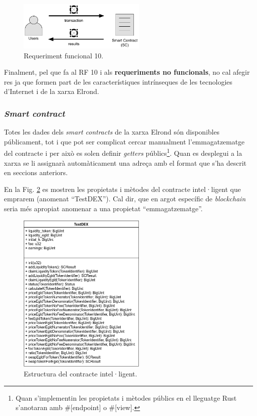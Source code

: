 \documentclass[11pt,a4paper]{article}
\begin{document}
\begin{figure}[h]
\includegraphics[width=0.55\textwidth]{cu_trans_results.png}
\centering
\caption{Requeriment funcional 10.}\label{fig:transresults}
\end{figure} 

Finalment, pel que fa al RF 10 i als \textbf{requeriments no funcionals}, no cal afegir res ja que formen part de les característiques intrínseques de les tecnologies d'Internet i de la xarxa Elrond.

\subsubsection{\textit{Smart contract}}\label{subsub:sc}
Totes les dades dels \textit{smart contracts} de la xarxa Elrond són disponibles públicament, tot i que pot ser complicat cercar manualment l'emmagatzematge del contracte i per això es solen definir \textit{getters} públics\footnote{Quan s'implementin les propietats i mètodes públics en el lleguatge Rust s'anotaran amb \#[endpoint] o \#[view].}. Quan es desplegui a la xarxa se li assignarà automàticament una adreça amb el format que s'ha descrit en seccions anteriors.

En la Fig. \ref{fig:testdex} es mostren les propietats i mètodes del contracte intel·ligent que emprarem (anomenat ``TestDEX''). Cal dir, que en argot específic de \textit{blockchain} seria més apropiat anomenar a una propietat ``emmagatzematge''. 

\begin{figure}[h]
\includegraphics[width=0.55\textwidth]{TestDEX.png}
\centering
\caption{Estructura del contracte intel·ligent.}\label{fig:testdex}
\end{figure} 
\end{document}
